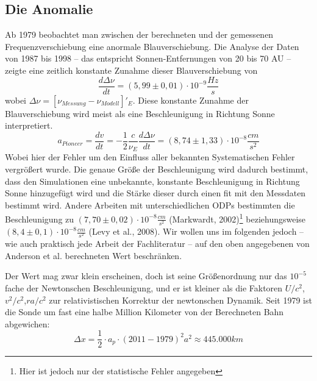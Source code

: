 
\subsection{Die Anomalie}
Ab 1979 beobachtet man zwischen der berechneten und der gemessenen Frequenzverschiebung eine anormale Blauverschiebung.
Die Analyse der Daten von 1987 bis 1998 – das entspricht Sonnen-Entfernungen von 20 bis 70 AU – zeigte eine zeitlich konstante Zunahme dieser
Blauverschiebung von
\begin{equation}
  \frac{d\Delta\nu}{dt}=(5,99\pm0,01)\cdot10^{-9}\frac{Hz}{s}
\end{equation}
wobei $\Delta\nu=[\nu_{Messung}-\nu_{Modell}]'_E$. Diese konstante Zunahme der Blauverschiebung wird meist als eine
Beschleunigung in Richtung Sonne interpretiert.
\begin{equation}
  a_{Pioneer}=\frac{dv}{dt}=-\frac{1}{2}\frac{c}{\nu_E}\frac{d\Delta\nu}{dt} = (8,74\pm1,33)\cdot10^{-8}\frac{cm}{s^2}
\end{equation}
Wobei hier der Fehler um den Einfluss aller bekannten Systematischen Fehler vergrößert wurde.\cite{Turyshev2004}
Die genaue Größe der Beschleunigung wird dadurch bestimmt, dass den Simulationen eine unbekannte, konstante Beschleunigung in Richtung Sonne hinzugefügt wird und die Stärke dieser durch einen fit
mit den Messdaten bestimmt wird.	%
Andere Arbeiten mit unterschiedlichen ODPs bestimmten die Beschleunigung zu $(7,70
\pm0,02)\cdot10^{-8}\frac{cm}{s^2}$ (Markwardt,
2002)\footnote{Hier ist jedoch nur der statistische Fehler angegeben}\cite{Markwardt2002} beziehungsweise
$(8,4\pm0,1)\cdot10^{-8}\frac{cm}{s^2}$ (Levy et al., 2008)\cite{Levy2008}.
Wir wollen uns im folgenden jedoch – wie auch praktisch jede Arbeit der Fachliteratur – auf den oben angegebenen von
Anderson et al. berechneten Wert beschränken.

Der Wert mag zwar klein erscheinen, doch ist seine Größenordnung nur das $10^{-5}$ fache der Newtonschen Beschleunigung,
und er ist kleiner als die Faktoren $U/c^2$,$v^2/c^2$,$r a/c^2$ zur relativistischen Korrektur der newtonschen Dynamik.
Seit 1979 ist die Sonde um fast eine halbe Million Kilometer von der Berechneten Bahn abgewichen:
\begin{equation}
  \Delta x= \frac12 \cdot a_p \cdot (2011-1979)^2 a^2\approx 445.000 km
\end{equation}

